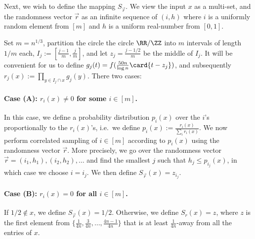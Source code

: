 Next, we wish to define the mapping $S_{\vec{r}}$. We view the input $x$ as a multi-set, and
the randomness vector $\vec{r}$ as an infinite sequence of $(i,h)$ where $i$ is a uniformly
random element from $[m]$ and $h$ is a uniform real-number from $[0,1]$.

Set $m = n^{1/3}$, partition the circle
the circle $\RR/\ZZ$ into $m$ intervals of length $1/m$ each, $I_j:= \left[\frac{j-1}{m},\frac{j}{m}\right]$, and
let $z_j = \frac{j-1/2}{m}$ be the middle of $I_j$.
It will be convenient for us to define $g_j(t) = f(\frac{50n}{\log n}\card{t-z_j})$,
and subsequently $r_j(x):= \prod\limits_{y\in I_j\cap x} g_j(y)$.
There two cases:

\paragraph{Case (A): $r_i(x)\neq 0$ for some $i\in [m]$.}
In this case, we define a probability distribution $p_i(x)$ over the $i$'s proportionally to the $r_i(x)$'s, i.e.\
we define $p_i(x):=\frac{r_i(x)}{\sum_i r_i(x)}$. We now perform correlated sampling of $i\in[m]$ according to $p_i(x)$ using the randomness vector $\vec{r}$.
More precisely, we go over the randomness vector $\vec{r} = (i_1,h_1),(i_2,h_2),\ldots$ and find the smallest $j$ such that
$h_j\leq p_{i_j}(x)$, in which case we choose $i = i_j$. We then define $S_{\vec{r}}(x) = z_{i_j}$.


\paragraph{Case (B): $r_i(x) = 0$ for all $i\in [m]$.}
If $1/2\not\in x$, we define $S_{\vec{r}}(x) = 1/2$.
Otherwise, we define $S_r(x)=z$, where $z$ is the first element from $\{\frac{1}{4n}, \frac{3}{4n},\ldots,\frac{4n-1}{4n}\}$ that is at least $\frac{1}{4n}$-away from all the
entries of $x$.

